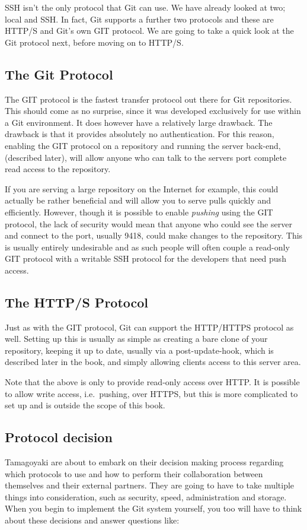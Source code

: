 SSH isn't the only protocol that Git can use.
We have already looked at two; local and SSH.
In fact, Git supports a further two protocols and these are HTTP/S and Git's own GIT protocol.
We are going to take a quick look at the Git protocol next, before moving on to HTTP/S.

\subsection{The Git Protocol}
The GIT protocol is the fastest transfer protocol out there for Git repositories.
This should come as no surprise, since it was developed exclusively for use within a Git environment.
It does however have a relatively large drawback.
The drawback is that it provides absolutely no authentication.
For this reason, enabling the GIT protocol on a repository and running the server back-end, (described later), will allow anyone who can talk to the servers port complete read access to the repository.

If you are serving a large repository on the Internet for example, this could actually be rather beneficial and will allow you to serve pulls quickly and efficiently.
However, though it is possible to enable \emph{pushing} using the GIT protocol, the lack of security would mean that anyone who could see the server and connect to the port, usually 9418, could make changes to the repository.
This is usually entirely undesirable and as such people will often couple a read-only GIT protocol with a writable SSH protocol for the developers that need push access.

\subsection{The HTTP/S Protocol}
Just as with the GIT protocol, Git can support the HTTP/HTTPS protocol as well.
Setting up this is usually as simple as creating a bare clone of your repository, keeping it up to date, usually via a post-update-hook, which is described later in the book, and simply allowing clients access to this server area.

Note that the above is only to provide read-only access over HTTP.
It is possible to allow write access, i.e.\ pushing, over HTTPS, but this is more complicated to set up and is outside the scope of this book.

\subsection{Protocol decision}
Tamagoyaki are about to embark on their decision making process regarding which protocols to use and how to perform their collaboration between themselves and their external partners.
They are going to have to take multiple things into consideration, such as security, speed, administration and storage.
When you begin to implement the Git system yourself, you too will have to think about these decisions and answer questions like:

